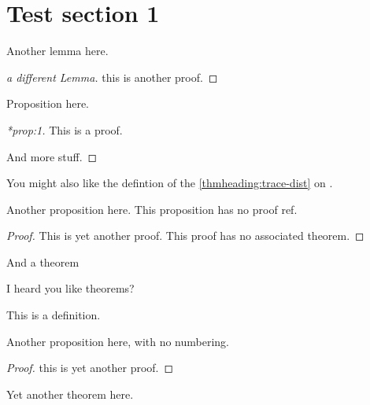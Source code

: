 \documentclass[12pt,a5paper]{article}
\begin{document}
\section{Test section 1}

\begin{lemma}
\label{lem:1}
Another lemma here.
\end{lemma}
\begin{proof}[a different Lemma]
  this is another proof.
\end{proof}


\begin{proposition}
  \label{prop:1}
  Proposition here.
\end{proposition}
\begin{proof}[*prop:1]
  This is a proof.

  And more stuff.
\end{proof}


You might also like the defintion of the \ref{thmheading:trace-dist} on .

\begin{proposition}
  \noproofref
  Another proposition here.  This proposition has no proof ref.
\end{proposition}

\begin{proof}
  This is yet another proof.  This proof has no associated theorem.
\end{proof}


\begin{theorem}
\label{thm:1}
And a theorem
\end{theorem}


\begin{theorem}
\noproofref
\label{thm:2}
I heard you like theorems?
\end{theorem}

\begin{definition*}
This is a definition.
\end{definition*}


\begin{proposition*}
Another proposition here, with no numbering.
\end{proposition*}
\begin{proof}
  this is yet another proof.
\end{proof}

\begin{theorem}
  \label{thm:another}
  Yet another theorem here.
\end{theorem}
\end{document}
